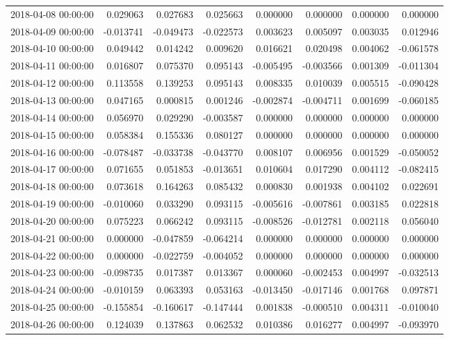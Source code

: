 \begin{tabular}{lrrrrrrr}
2018-04-08 00:00:00 & 0.029063 & 0.027683 & 0.025663 & 0.000000 & 0.000000 & 0.000000 & 0.000000 \\
2018-04-09 00:00:00 & -0.013741 & -0.049473 & -0.022573 & 0.003623 & 0.005097 & 0.003035 & 0.012946 \\
2018-04-10 00:00:00 & 0.049442 & 0.014242 & 0.009620 & 0.016621 & 0.020498 & 0.004062 & -0.061578 \\
2018-04-11 00:00:00 & 0.016807 & 0.075370 & 0.095143 & -0.005495 & -0.003566 & 0.001309 & -0.011304 \\
2018-04-12 00:00:00 & 0.113558 & 0.139253 & 0.095143 & 0.008335 & 0.010039 & 0.005515 & -0.090428 \\
2018-04-13 00:00:00 & 0.047165 & 0.000815 & 0.001246 & -0.002874 & -0.004711 & 0.001699 & -0.060185 \\
2018-04-14 00:00:00 & 0.056970 & 0.029290 & -0.003587 & 0.000000 & 0.000000 & 0.000000 & 0.000000 \\
2018-04-15 00:00:00 & 0.058384 & 0.155336 & 0.080127 & 0.000000 & 0.000000 & 0.000000 & 0.000000 \\
2018-04-16 00:00:00 & -0.078487 & -0.033738 & -0.043770 & 0.008107 & 0.006956 & 0.001529 & -0.050052 \\
2018-04-17 00:00:00 & 0.071655 & 0.051853 & -0.013651 & 0.010604 & 0.017290 & 0.004112 & -0.082415 \\
2018-04-18 00:00:00 & 0.073618 & 0.164263 & 0.085432 & 0.000830 & 0.001938 & 0.004102 & 0.022691 \\
2018-04-19 00:00:00 & -0.010060 & 0.033290 & 0.093115 & -0.005616 & -0.007861 & 0.003185 & 0.022818 \\
2018-04-20 00:00:00 & 0.075223 & 0.066242 & 0.093115 & -0.008526 & -0.012781 & 0.002118 & 0.056040 \\
2018-04-21 00:00:00 & 0.000000 & -0.047859 & -0.064214 & 0.000000 & 0.000000 & 0.000000 & 0.000000 \\
2018-04-22 00:00:00 & 0.000000 & -0.022759 & -0.004052 & 0.000000 & 0.000000 & 0.000000 & 0.000000 \\
2018-04-23 00:00:00 & -0.098735 & 0.017387 & 0.013367 & 0.000060 & -0.002453 & 0.004997 & -0.032513 \\
2018-04-24 00:00:00 & -0.010159 & 0.063393 & 0.053163 & -0.013450 & -0.017146 & 0.001768 & 0.097871 \\
2018-04-25 00:00:00 & -0.155854 & -0.160617 & -0.147444 & 0.001838 & -0.000510 & 0.004311 & -0.010040 \\
2018-04-26 00:00:00 & 0.124039 & 0.137863 & 0.062532 & 0.010386 & 0.016277 & 0.004997 & -0.093970 \\

\end{tabular}
